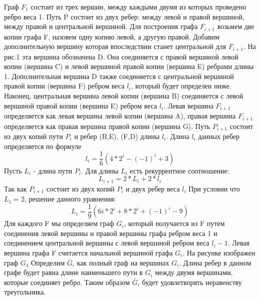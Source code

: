 \documentclass[a4paper, 14pt]{extarticle}
\begin{document}
Граф $F_1$ состоит из трех вершин, между каждыми двумя из которых проведено ребро веса 1. Путь P состоит из двух ребер: между левой и правой вершиной, между правой и центральной вершиной. Для построения графа $F_{i+1}$ возьмем две копии графа F, назовем одну копию левой, а другую правой. Добавим дополнительную вершину которая впоследствии станет центральной для $F_{i+1}$. На рис.1 эта вершина обозначена D. Она соединяется с правой вершиной левой копии (вершина C) и левой вершиной правой копии (вершина E) ребрами длины 1. Дополнительная вершина D также соединяется с центральной вершиной правой копии (вершина F) ребром веса $l_i$, который будет определен ниже. Наконец, центральная вершина левой копии (вершина B) соединяется с левой вершиной правой копии (вершина E) ребром веса $l_i$. Левая вершина $F_{i+1}$ определяется как левая вершина левой копии (вершина A), правая вершина $F_{i+1}$ определяется как правая вершина правой копии (вершина G). Путь $P_{i+1}$ состоит из двух копий пути $P_i$ и ребер (B,E), (F,D) длины  $l_i$. Длина $l_i$ данных ребер определяется по формуле
\begin{equation}\label{2.11}
l_i = \frac{1}{6}(4*2^i-(-1)^i+3)
\end{equation}
Пусть $L_i$ - длина пути $P_i$. Для длины $L_i$ есть рекуррентное соотношение:
\begin{equation}
L_{i+1} = 2*L_i+2*l_i
\end{equation}
Так как $P_{i+1}$ состоит из двух копий $P_i$ и двух ребер веса $l_i$ При условии что $L_1=2$, решение данного уравнения: 
\begin{equation}
L_i=\frac{1}{9}(6i*2^i+8*2^i+(-1)^i-9)
\end{equation}
Для каждого F мы определяем граф $G_i$, который получается из F путем соединения левой вершины и правой вершины графа ребром веса 1 и соединением центральной вершины с левой вершиной ребром веса $l_i-1$. Левая вершина графа F считается начальной вершиной графа $G_i$. На рисунке изображен граф $G_4$ Определим $\bar G_i$ как полный граф на вершинах $G_i$. Длина ребер в данном графе будет равна длине наименьшего пути в $G_i$ между двумя вершинами, которые соединяет ребро. Таким образом $\bar G_i$ будет удовлетворять неравенству треугольника.
\end{document}
